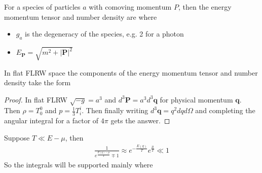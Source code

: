 \documentclass{article}
\begin{document}
\begin{definition}
For a species of particles $a$ with comoving momentum $P$, then the energy momentum tensor and number density are 
where 
\begin{itemize}
    \item $g_a$ is the degeneracy of the species, e.g. 2 for a photon
    \item $E_{\bm{P}} = \sqrt{m^2 + |\bm{P}|^2}$
\end{itemize}
\end{definition}

\begin{prop}
In flat FLRW space the components of the energy momentum tensor and number density take the form 
\end{prop}
\begin{proof}
In flat FLRW $\sqrt{-g} = a^3$ and $d^3\bm{P} = a^3 d^3\bm{q}$ for physical momentum $\bm{q}$. Then $\rho = T^0_0$ and $p=\frac{1}{3}T^i_i$. Then finally writing $d^3\bm{q}=q^2 dq d\Omega$ and completing the angular integral for a factor of $4\pi$ gets the answer. 
\end{proof}
Suppose $T \ll E - \mu $, then 
\begin{align}\label{eq:CSM:4}
\frac{1}{e^\frac{E(q)-\mu}{T}\mp1} \approx  e^{-\frac{E(q)}{T}}e^{\frac{\mu}{T}} \ll 1 
\end{align}
So the integrals will be supported mainly where 
\end{document}
